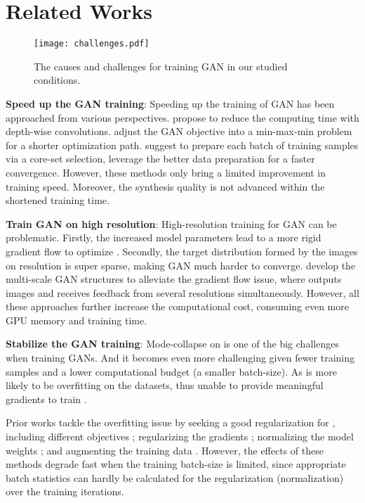 \documentclass{article} \usepackage{iclr2021_conference,times}
\begin{document}
\section{Related Works}

\begin{wrapfigure}{r}{0.5\textwidth} 
\centering
    \texttt{[image: challenges.pdf]}
    \caption{The causes and challenges for training GAN in our studied conditions.}
    \label{fig:challenges}
\end{wrapfigure}

\textbf{Speed up the GAN training}: Speeding up the training of GAN has been approached from various perspectives. \citeauthor{ngxande2019depthwisegans} propose to reduce the computing time with depth-wise convolutions. \citeauthor{zhong2020improving} adjust the GAN objective into a min-max-min problem for a shorter optimization path.  \citeauthor{sinha2019small} suggest to prepare each batch of training samples via a core-set selection, leverage the better data preparation for a faster convergence. However, these methods only bring a limited improvement in training speed. Moreover, the synthesis quality is not advanced within the shortened training time.

\textbf{Train GAN on high resolution}: High-resolution training for GAN can be problematic. Firstly, the increased model parameters lead to a more rigid gradient flow to optimize . Secondly, the target distribution formed by the images on  resolution is super sparse, making GAN much harder to converge. \cite{denton2015deep,zhang2017stackgan,huang2017stacked,wang2018high,karras2019style,karnewar2019msg,karras2020analyzing,liu2020time} develop the multi-scale GAN structures to alleviate the gradient flow issue, where  outputs images and receives feedback from several resolutions simultaneously. However, all these approaches further increase the computational cost, consuming even more GPU memory and training time. 

\textbf{Stabilize the GAN training}: 
Mode-collapse on  is one of the big challenges when training GANs. And it becomes even more challenging given fewer training samples and a lower computational budget (a smaller batch-size). As  is more likely to be overfitting on the datasets, thus unable to provide meaningful gradients to train  \citep{gulrajani2017improved}.

Prior works tackle the overfitting issue by seeking a good regularization for , including different objectives \citep{arjovsky2017wasserstein,lim2017geometric,tran2017deep}; regularizing the gradients \citep{gulrajani2017improved,mescheder2018training}; normalizing the model weights \citep{miyato2018spectral}; and augmenting the training data \citep{karras2020training,zhao2020differentiable}. However, the effects of these methods degrade fast when the training batch-size is limited, since appropriate batch statistics can hardly be calculated for the regularization (normalization) over the training iterations. 
\end{document}
